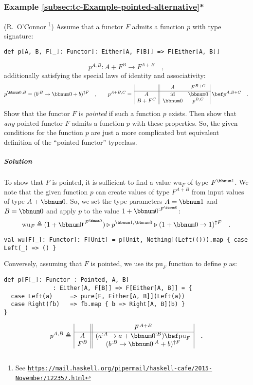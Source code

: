 \subsubsection{Example \label{subsec:tc-Example-pointed-alternative}\ref{subsec:tc-Example-pointed-alternative}{*}}

(R.~O\textsf{'}Connor \footnote{See \texttt{\href{https://mail.haskell.org/pipermail/haskell-cafe/2015-November/122357.html}{https://mail.haskell.org/pipermail/haskell-cafe/2015-November/122357.html}}})
Assume that a functor $F$ admits a function $p$ with type signature:
\begin{lstlisting}
def p[A, B, F[_]: Functor]: Either[A, F[B]] => F[Either[A, B]]
\end{lstlisting}
\[
p^{A,B}:A+F^{B}\rightarrow F^{A+B}\quad,
\]
additionally satisfying the special laws of identity and associativity:
\[
p^{\bbnum 0,B}=(b^{:B}\rightarrow\bbnum 0+b)^{\uparrow F}\quad,\quad\quad p^{A+B,C}=\,\begin{array}{|c||cc|}
 & A & F^{B+C}\\
\hline A & \text{id} & \bbnum 0\\
B+F^{C} & \bbnum 0 & p^{B,C}
\end{array}\,\bef p^{A,B+C}\quad.
\]
Show that the functor $F$ is \emph{pointed} if such a function $p$
exists. Then show that \emph{any} pointed functor $F$ admits a function
$p$ with these properties. So, the given conditions for the function
$p$ are just a more complicated but equivalent definition of the
\textsf{``}pointed functor\textsf{''} typeclass.

\subparagraph{Solution}

To show that $F$ is pointed, it is sufficient to find a value $\text{wu}_{F}$
of type $F^{\bbnum 1}$. We note that the given function $p$ can
create values of type $F^{A+B}$ from input values of type $A+\bbnum 0$.
So, we set the type parameters $A=\bbnum 1$ and $B=\bbnum 0$ and
apply $p$ to the value $1+\bbnum 0^{:F^{\bbnum 0}}$:
\[
\text{wu}_{F}\triangleq(1+\bbnum 0^{:F^{\bbnum 0}})\triangleright p^{\bbnum 1,\bbnum 0}\triangleright(1+\bbnum 0\rightarrow1)^{\uparrow F}\quad.
\]
\begin{lstlisting}
val wu[F[_]: Functor]: F[Unit] = p[Unit, Nothing](Left(())).map { case Left(_) => () }
\end{lstlisting}

Conversely, assuming that $F$ is pointed, we use its $\text{pu}_{F}$
function to define $p$ as:
\begin{lstlisting}
def p[F[_]: Functor : Pointed, A, B]
              : Either[A, F[B]] => F[Either[A, B]] = {
  case Left(a)     => pure[F, Either[A, B]](Left(a))
  case Right(fb)   => fb.map { b => Right[A, B](b) }
}
\end{lstlisting}
\[
p^{A,B}\triangleq\,\begin{array}{|c||c|}
 & F^{A+B}\\
\hline A & (a^{:A}\rightarrow a+\bbnum 0^{:B})\bef\text{pu}_{F}\\
F^{B} & (b^{:B}\rightarrow\bbnum 0^{:A}+b)^{\uparrow F}
\end{array}\quad.
\]

